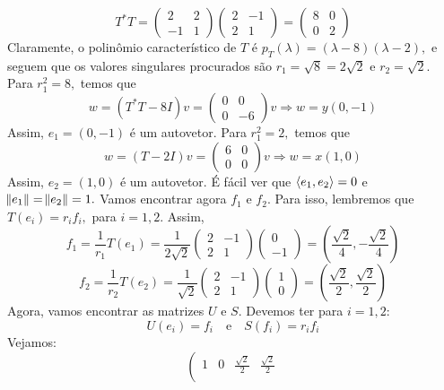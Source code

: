 \documentclass[11pt,a4paper]{article}
\begin{document}
{{\[T^{*}T = \begin{pmatrix}
2 & 2 \\
-1 & 1
\end{pmatrix} \begin{pmatrix}
2 & -1 \\
2 & 1
\end{pmatrix} = \begin{pmatrix}
8 & 0 \\
0 & 2
\end{pmatrix}\]
Claramente, o polinômio característico de $T$ é $p_T(\lambda) = (\lambda - 8)(\lambda - 2),$ e seguem que os valores singulares procurados são $r_1 = \sqrt{8} = 2 \sqrt{2}$ e $r_2 = \sqrt{2}.$
Para $r_1^2 = 8,$ temos que
\[
w = (T^{*}T - 8I)v = \left(\begin{matrix}
0 & 0 \\
0 & -6
\end{matrix}\right)v \Rightarrow w = y(0,-1)
\]
Assim, $e_1 = (0,-1)$ é um autovetor.
Para $r_1^2 = 2,$ temos que
\[
w = (T - 2I)v = \left(\begin{matrix}
6 & 0 \\
0 & 0
\end{matrix}\right)v \Rightarrow w = x(1,0)
\]
Assim, $e_2 = (1,0)$ é um autovetor.
É fácil ver que $\left\langle e_1, e_2 \right\rangle = 0$ e $\norm{e_1} = \norm{e_2} = 1.$
Vamos encontrar agora $f_1$ e $f_2.$ Para isso, lembremos que $T(e_i) = r_i f_i,$ para $i = 1,2.$ Assim,
\[
f_1 = \frac{1}{r_1} T(e_1) = \frac{1}{2 \sqrt{2}} \begin{pmatrix}
2 & -1 \\
2 & 1
\end{pmatrix} \begin{pmatrix} 0 \\ -1 \end{pmatrix} = \left( \frac{\sqrt{2}}{4}, -\frac{\sqrt{2}}{4} \right)
\]
\[
f_2 = \frac{1}{r_2} T(e_2) = \frac{1}{\sqrt{2}} \begin{pmatrix}
2 & -1 \\
2 & 1
\end{pmatrix} \begin{pmatrix} 1 \\ 0 \end{pmatrix} = \left( \frac{\sqrt{2}}{2}, \frac{\sqrt{2}}{2} \right) 
\]
Agora, vamos encontrar as matrizes $U$ e $S.$ Devemos ter para $i = 1, 2:$
\[
U(e_i) = f_i \quad \mbox{e} \quad S(f_i) = r_if_i
\]
Vejamos:
\[
\left(\begin{array}{cc|cc}
1 & 0 &  \frac{\sqrt{2}}{2} & \frac{\sqrt{2}}{2} \\

\end{array}\]}}
\end{document}
